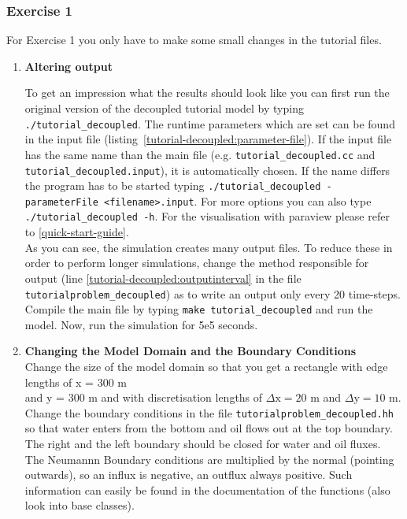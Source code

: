 \subsubsection{Exercise 1}
\renewcommand{\labelenumi}{\alph{enumi})}
For Exercise 1 you only have to make some small changes in the tutorial files.
\begin{enumerate}
\item \textbf{Altering output}

To get an impression what the results should look like you can first run the
original version of the decoupled tutorial model by typing  \texttt{./tutorial\_decoupled}.
The runtime parameters which are set can be found in the input file (listing~\ref{tutorial-decoupled:parameter-file}).
If the input file has the same name than the main file (e.g. \texttt{tutorial\_decoupled.cc}
and \texttt{tutorial\_decoupled.input}), it is automatically chosen. If the name differs
the program has to be started typing \texttt{./tutorial\_decoupled -parameterFile <filename>.input}.
For more options you can also type \texttt{./tutorial\_decoupled -h}. For the
visualisation with paraview please refer to \ref{quick-start-guide}.\\
As you can see, the simulation creates many output files. To reduce these in order
to perform longer simulations, change the method responsible for output (line
\ref{tutorial-decoupled:outputinterval} in the file \texttt{tutorialproblem\_decoupled})
as to write an output only every 20 time-steps. Compile the main file by typing
\texttt{make tutorial\_decoupled} and run the model. Now, run the simulation for 5e5 seconds.

\item \textbf{Changing the Model Domain and the Boundary Conditions} \\
Change the size of the model domain so that you get a rectangle
with edge lengths of x = 300 m \\  and y = 300 m and with discretisation lengths
of  $\Delta \text{x} = 20$ m and $\Delta \text{y} = 10$ m. \\
Change the boundary conditions in the file \texttt{tutorialproblem\_decoupled.hh}
so that water enters from the bottom and oil flows out at the top boundary. The
right and the left boundary should be closed for water and oil fluxes. The Neumannn
Boundary conditions are multiplied by the normal (pointing outwards), so an influx
is negative, an outflux always positive. Such information can easily be found in the
documentation of the functions (also look into base classes).


\end{enumerate}
